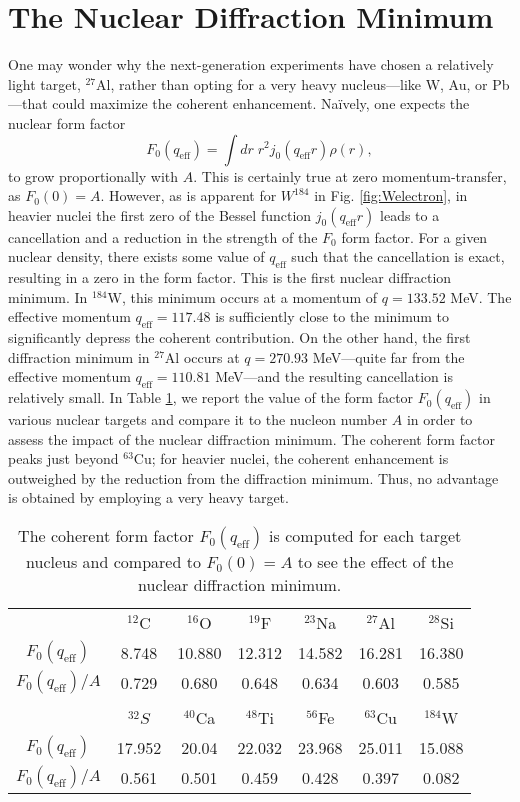 \documentclass[12pt,letterpaper]{book}
\begin{document}
\section{The Nuclear Diffraction Minimum}
One may wonder why the next-generation experiments have chosen a relatively light target, $^{27}$Al, rather than opting for a very heavy nucleus---like W, Au, or Pb---that could maximize the coherent enhancement. Na\"ively, one expects the nuclear form factor
\begin{equation}
F_0(q_\mathrm{eff})=\int dr \;r^2j_0(q_\mathrm{eff}r)\rho(r),
\end{equation} 
to grow proportionally with $A$. This is certainly true at zero momentum-transfer, as $F_0(0) = A$. However, as is apparent for $W^{184}$ in Fig. \ref{fig:Welectron}, in heavier nuclei the first zero of the Bessel function $j_0(q_\mathrm{eff}r)$ leads to a cancellation and a reduction in the strength of the $F_0$ form factor. For a given nuclear density, there exists some value of $q_\mathrm{eff}$ such that the cancellation is exact, resulting in a zero in the form factor. This is the first nuclear diffraction minimum. In $^{184}$W, this minimum occurs at a momentum of $q=133.52$ MeV. The effective momentum $q_\mathrm{eff}=117.48$ is sufficiently close to the minimum to significantly depress the coherent contribution. On the other hand, the first diffraction minimum in $^{27}$Al occurs at $q=270.93$ MeV---quite far from the effective momentum $q_\mathrm{eff}=110.81$ MeV---and the resulting cancellation is relatively small. In Table \ref{tab:diff_min}, we report the value of the form factor $F_0(q_\mathrm{eff})$ in various nuclear targets and compare it to the nucleon number $A$ in order to assess the impact of the nuclear diffraction minimum. The coherent form factor peaks just beyond $^{63}$Cu; for heavier nuclei, the coherent enhancement is outweighed by the reduction from the diffraction minimum. Thus, no advantage is obtained by employing a very heavy target.
\begin{table}
\centering
\begin{tabular}{ccccccc}
\hline
\hline
 & $^{12}$C & $^{16}$O & $^{19}$F & $^{23}$Na & $^{27}$Al & $^{28}$Si \\
 $F_0(q_\mathrm{eff})$ & 8.748 & 10.880 & 12.312 & 14.582 & 16.281 & 16.380 \\
$F_0(q_\mathrm{eff})/A$ & 0.729 & 0.680 & 0.648 & 0.634 & 0.603 & 0.585\\
\\
  & $^{32}S$ & $^{40}$Ca & $^{48}$Ti & $^{56}$Fe & $^{63}$Cu & $^{184}$W \\
 $F_0(q_\mathrm{eff})$ & 17.952 & 20.04 & 22.032 & 23.968 & 25.011 & 15.088\\
$F_0(q_\mathrm{eff})/A$  & 0.561 & 0.501 & 0.459 & 0.428 & 0.397 & 0.082\\
  \hline
  \hline
\end{tabular}
\caption{The coherent form factor $F_0(q_\mathrm{eff})$ is computed for each target nucleus and compared to $F_0(0)=A$ to see the effect of the nuclear diffraction minimum.}
\label{tab:diff_min}
\end{table}
\end{document}
